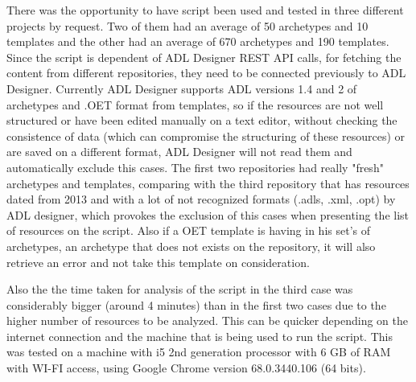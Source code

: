 \documentclass[mim_thesis.tex]{subfiles}
\begin{document}
There was the opportunity to have script been used and tested in three different projects by request. Two of them had an average of 50 archetypes and 10 templates and the other had an average of 670 archetypes and 190 templates. Since the script is dependent of ADL Designer REST API calls, for fetching the content from different repositories, they need to be connected previously to ADL Designer. Currently ADL Designer supports ADL versions 1.4 and 2 of archetypes and .OET format from templates, so if the resources are not well structured or have been edited manually on a text editor, without checking the consistence of data (which can compromise the structuring of these resources) or are saved on a different format, ADL Designer will not read them and automatically exclude this cases. The first two repositories had really "fresh" archetypes and templates, comparing with the third repository that has resources dated from 2013 and with a lot of not recognized formats (.adls, .xml, .opt) by ADL designer, which provokes the exclusion of this cases when presenting the list of resources on the script. Also if a OET template is having in his set's of archetypes, an archetype that does not exists on the repository, it will also retrieve an error and not take this template on consideration.

Also the the time taken for analysis of the script in the third case was considerably bigger (around 4 minutes) than in the first two cases due to the higher number of resources to be analyzed. This can be quicker depending on the internet connection and the machine that is being used to run the script. This was tested on a machine with i5 2nd generation processor with 6 GB of RAM with WI-FI access, using Google Chrome version 68.0.3440.106 (64 bits).
\end{document}

